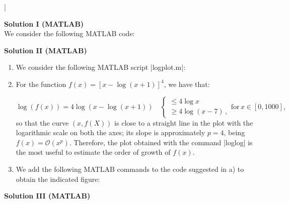 \documentclass[11pt]{article}
\begin{document}
\lstset{frameround=fttt,language=Matlab}

\lstMakeShortInline[columns=fixed]|



{\bf{Solution I (MATLAB)}}\\

We consider the following MATLAB code:


\bigskip

{\bf{Solution II (MATLAB)}}\\

\begin{enumerate}

\item We consider the following MATLAB script |logplot.m|:


\item For the function $f(x) = [x - \log(x+1)]^4$, we have that:

\[
\log(f(x)) = 4 \log(x-\log(x+1)) \quad 
\begin{cases} 
      \leq 4\log x \\
      \geq 4 \log(x-7) \, , 
\end{cases}
\text{for} \, x \in [0, 1000],
\]
so that the curve $(x,f(X))$ is close to a straight line in the plot with the logarithmic scale on both the axes; its slope is approximately $p=4$, being $f(x)=\mathcal{O}(x^p)$. Therefore, the plot obtained with the command |loglog| is the most useful to estimate the order of growth of $f(x)$.

\item We add the following MATLAB commands to the code suggested in a) to obtain the indicated figure:

\end{enumerate}


{\bf{Solution III (MATLAB)}}\\
\end{document}

